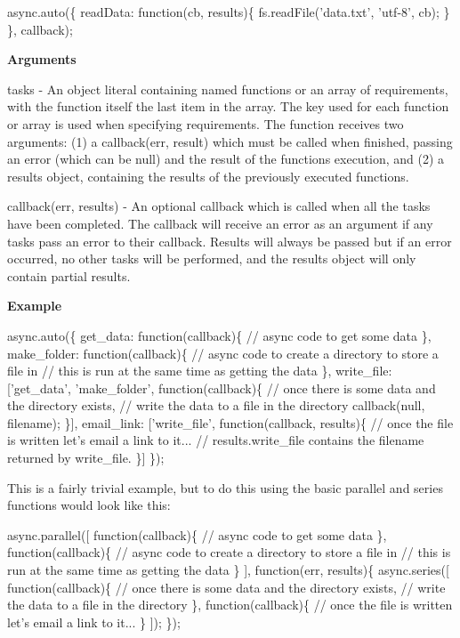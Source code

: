 \begin{DoxyCode}
async.auto(\{
  readData: function(cb, results)\{
    fs.readFile('data.txt', 'utf-8', cb);
  \}
\}, callback);
\end{DoxyCode}


{\bfseries Arguments}


\begin{DoxyItemize}
\item tasks -\/ An object literal containing named functions or an array of requirements, with the function itself the last item in the array. The key used for each function or array is used when specifying requirements. The function receives two arguments\+: (1) a callback(err, result) which must be called when finished, passing an error (which can be null) and the result of the function\textquotesingle{}s execution, and (2) a results object, containing the results of the previously executed functions.
\item callback(err, results) -\/ An optional callback which is called when all the tasks have been completed. The callback will receive an error as an argument if any tasks pass an error to their callback. Results will always be passed but if an error occurred, no other tasks will be performed, and the results object will only contain partial results.
\end{DoxyItemize}

{\bfseries Example}


\begin{DoxyCode}
async.auto(\{
    get\_data: function(callback)\{
        // async code to get some data
    \},
    make\_folder: function(callback)\{
        // async code to create a directory to store a file in
        // this is run at the same time as getting the data
    \},
    write\_file: ['get\_data', 'make\_folder', function(callback)\{
        // once there is some data and the directory exists,
        // write the data to a file in the directory
        callback(null, filename);
    \}],
    email\_link: ['write\_file', function(callback, results)\{
        // once the file is written let's email a link to it...
        // results.write\_file contains the filename returned by write\_file.
    \}]
\});
\end{DoxyCode}


This is a fairly trivial example, but to do this using the basic parallel and series functions would look like this\+:


\begin{DoxyCode}
async.parallel([
    function(callback)\{
        // async code to get some data
    \},
    function(callback)\{
        // async code to create a directory to store a file in
        // this is run at the same time as getting the data
    \}
],
function(err, results)\{
    async.series([
        function(callback)\{
            // once there is some data and the directory exists,
            // write the data to a file in the directory
        \},
        function(callback)\{
            // once the file is written let's email a link to it...
        \}
    ]);
\});
\end{DoxyCode}


